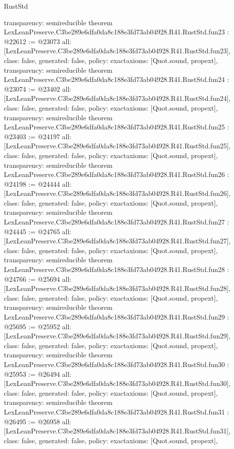 \begin{lexlean}{RustStd}
\begin{coremodule}
{  transparency: semireducible
}
theorem LexLeanPreserve.C3be289e6dfa0da8c188e3fd73ab04928.R41.RustStd.fun23 : @22612 := @23073 {
  all: [LexLeanPreserve.C3be289e6dfa0da8c188e3fd73ab04928.R41.RustStd.fun23],
  class: false,
  generated: false,
  policy: exact{axioms: [Quot.sound, propext]},
  transparency: semireducible
}
theorem LexLeanPreserve.C3be289e6dfa0da8c188e3fd73ab04928.R41.RustStd.fun24 : @23074 := @23402 {
  all: [LexLeanPreserve.C3be289e6dfa0da8c188e3fd73ab04928.R41.RustStd.fun24],
  class: false,
  generated: false,
  policy: exact{axioms: [Quot.sound, propext]},
  transparency: semireducible
}
theorem LexLeanPreserve.C3be289e6dfa0da8c188e3fd73ab04928.R41.RustStd.fun25 : @23403 := @24197 {
  all: [LexLeanPreserve.C3be289e6dfa0da8c188e3fd73ab04928.R41.RustStd.fun25],
  class: false,
  generated: false,
  policy: exact{axioms: [Quot.sound, propext]},
  transparency: semireducible
}
theorem LexLeanPreserve.C3be289e6dfa0da8c188e3fd73ab04928.R41.RustStd.fun26 : @24198 := @24444 {
  all: [LexLeanPreserve.C3be289e6dfa0da8c188e3fd73ab04928.R41.RustStd.fun26],
  class: false,
  generated: false,
  policy: exact{axioms: [Quot.sound, propext]},
  transparency: semireducible
}
theorem LexLeanPreserve.C3be289e6dfa0da8c188e3fd73ab04928.R41.RustStd.fun27 : @24445 := @24765 {
  all: [LexLeanPreserve.C3be289e6dfa0da8c188e3fd73ab04928.R41.RustStd.fun27],
  class: false,
  generated: false,
  policy: exact{axioms: [Quot.sound, propext]},
  transparency: semireducible
}
theorem LexLeanPreserve.C3be289e6dfa0da8c188e3fd73ab04928.R41.RustStd.fun28 : @24766 := @25694 {
  all: [LexLeanPreserve.C3be289e6dfa0da8c188e3fd73ab04928.R41.RustStd.fun28],
  class: false,
  generated: false,
  policy: exact{axioms: [Quot.sound, propext]},
  transparency: semireducible
}
theorem LexLeanPreserve.C3be289e6dfa0da8c188e3fd73ab04928.R41.RustStd.fun29 : @25695 := @25952 {
  all: [LexLeanPreserve.C3be289e6dfa0da8c188e3fd73ab04928.R41.RustStd.fun29],
  class: false,
  generated: false,
  policy: exact{axioms: [Quot.sound, propext]},
  transparency: semireducible
}
theorem LexLeanPreserve.C3be289e6dfa0da8c188e3fd73ab04928.R41.RustStd.fun30 : @25953 := @26494 {
  all: [LexLeanPreserve.C3be289e6dfa0da8c188e3fd73ab04928.R41.RustStd.fun30],
  class: false,
  generated: false,
  policy: exact{axioms: [Quot.sound, propext]},
  transparency: semireducible
}
theorem LexLeanPreserve.C3be289e6dfa0da8c188e3fd73ab04928.R41.RustStd.fun31 : @26495 := @26958 {
  all: [LexLeanPreserve.C3be289e6dfa0da8c188e3fd73ab04928.R41.RustStd.fun31],
  class: false,
  generated: false,
  policy: exact{axioms: [Quot.sound, propext]},
}
\end{coremodule}
\end{lexlean}
